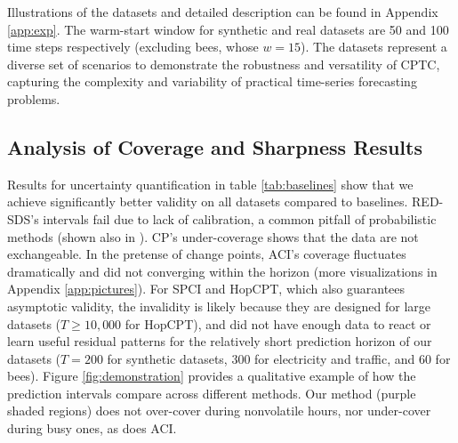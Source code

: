 Illustrations of the datasets and detailed description can be found in Appendix \ref{app:exp}. The warm-start window for synthetic and real datasets are 50 and 100 time steps respectively (excluding bees, whose $w=15$). The datasets represent a diverse set of scenarios to demonstrate the robustness and versatility of CPTC, capturing the complexity and variability of practical time-series forecasting problems.%

\vspace{-0.5em}
\subsection{Analysis of Coverage and Sharpness Results}
\vspace{-0.2em}
Results for uncertainty quantification in table \ref{tab:baselines} show that we achieve significantly better validity on all datasets compared to baselines. RED-SDS's intervals fail due to lack of calibration, a common pitfall of probabilistic methods (shown also in \cite{xu2023sequential}). CP's under-coverage shows that the data are not exchangeable. In the pretense of change points, ACI's coverage fluctuates dramatically and did not converging within the horizon (more visualizations in Appendix \ref{app:pictures}).  For SPCI and HopCPT, which also guarantees asymptotic validity, the invalidity is likely because they are designed for large datasets ($T \geq 10,000$ for HopCPT), and did not have enough data to react or learn useful residual patterns for the relatively short prediction horizon of our datasets ($T=200$ for synthetic datasets, 300 for electricity and traffic, and 60 for bees).  Figure \ref{fig:demonstration} provides a qualitative example of how the prediction intervals compare across different methods. Our method (purple shaded regions) does not over-cover during nonvolatile hours, nor under-cover during busy ones, as does ACI. %

